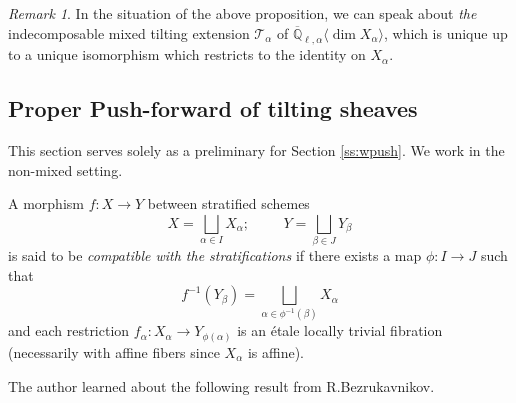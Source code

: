 \documentclass{amsart}
\theoremstyle{plain}
\theoremstyle{definition}
\theoremstyle{remark}
\newtheorem*{remark}{Remark}
\numberwithin{equation}{subsection}
\begin{document}
\begin{remark}
In the situation of the above proposition, we can speak about {\em the} indecomposable mixed tilting extension ${\mathcal{T}}_\alpha$ of ${\overline{\mathbb{Q}}_{\ell,\alpha}{\langle{{\dim X_\alpha}}\rangle}}$, which is unique up to a unique isomorphism which restricts to the identity on $X_\alpha$.
\end{remark}

\subsection{Proper Push-forward of tilting sheaves}\label{ss:push} This section serves solely as a preliminary for Section \ref{ss:wpush}. We work in the non-mixed setting.

A morphism $f:X\to Y$ between stratified schemes
\begin{equation*}
X=\bigsqcup_{\alpha\in I}X_\alpha;\hspace{1cm}Y=\bigsqcup_{\beta\in J}Y_{\beta}
\end{equation*}
is said to be {\em compatible with the stratifications} if there exists a map $\phi:I\to J$ such that
\begin{equation*}
f^{-1}(Y_\beta)=\bigsqcup_{\alpha\in\phi^{-1}(\beta)}X_\alpha
\end{equation*}
and each restriction $f_\alpha:X_\alpha\to Y_{\phi(\alpha)}$ is an \'{e}tale locally trivial fibration (necessarily with affine fibers since $X_\alpha$ is affine).

The author learned about the following result from R.Bezrukavnikov.
\end{document}
